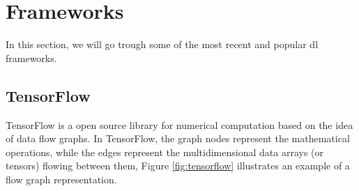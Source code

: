 \section{Frameworks}
In this section, we will go trough some of the most recent and popular \gls{dl} frameworks.

\subsection{TensorFlow}
TensorFlow is a open source library for numerical computation based on the idea of data flow graphs. In TensorFlow, the graph nodes represent the mathematical operations, while the edges represent the multidimensional data arrays (or tensors) flowing between them, Figure \ref{fig:tensorflow} illustrates an example of a flow graph representation.

